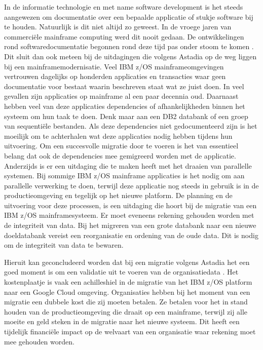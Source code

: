 In de informatie technologie en met name software development is het steeds aangewezen om documentatie over een bepaalde applicatie of stukje software bij te houden. Natuurlijk is dit niet altijd zo geweest. In de vroege jaren van commerciële mainframe computing werd dit nooit gedaan. De ontwikkelingen rond softwaredocumentatie begonnen rond deze tijd pas onder stoom te komen \autocite{Zachry2001}. Dit sluit dan ook meteen  bij de uitdagingen die volgens Astadia op de weg liggen bij een mainframemodernisatie. Veel IBM z/OS mainframeomgevingen vertrouwen dagelijks op honderden applicaties en transacties waar geen documentatie voor bestaat waarin beschreven staat wat ze juist doen. In veel gevallen zijn applicaties op mainframe al een paar decennia oud. Daarnaast hebben veel van deze applicaties dependencies of afhankelijkheden binnen het systeem om hun taak te doen. Denk maar aan een DB2 databank of een groep van sequentiële bestanden. Als deze dependencies niet gedocumenteerd zijn is het moeilijk om te achterhalen wat deze applicaties nodig hebben tijdens hun uitvoering. Om een succesvolle migratie door te voeren is het van essentieel belang dat ook de dependencies mee gemigreerd worden met de applicatie. Anderzijds is er een uitdaging die te maken heeft met het draaien van parallelle systemen. Bij sommige IBM z/OS mainframe applicaties is het nodig om aan parallelle verwerking te doen, terwijl deze applicatie nog steeds in gebruik is in de productieomgeving en tegelijk op het nieuwe platform. De planning en de uitvoering voor deze processen, is een uitdaging die hoort bij de migratie van een IBM z/OS mainframesysteem. Er moet eveneens rekening gehouden worden met de integriteit van data. Bij het migreren van een grote databank naar een nieuwe doeldatabank vereist een reorganisatie en ordening van de oude data. Dit is nodig om de integriteit van data te bewaren. 

Hieruit kan geconcludeerd worden dat bij een migratie volgens Astadia het een goed moment is om een validatie uit te voeren van de organisatiedata \autocite{Astadia2021}. Het kostenplaatje is vaak een achilleshiel in de migratie van het IBM z/OS platform naar een Google Cloud omgeving. Organisaties hebben bij het moment van een migratie een dubbele kost die zij moeten betalen. Ze betalen voor het in stand houden van de productieomgeving die draait op een mainframe, terwijl zij alle moeite en geld steken in de migratie naar het nieuwe systeem. Dit heeft een tijdelijk financiële impact op de welvaart van een organisatie waar rekening moet mee gehouden worden. 

